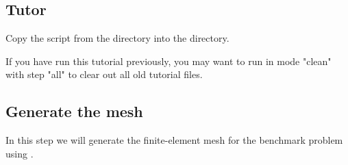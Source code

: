 \subsection{Tutor}

Copy the  script from the 
directory into the  directory. 

\begin{tip}
  If you have run this tutorial previously, you may want to run
   in mode "clean" with step "all" to clear out all
  old tutorial files.
\end{tip}

\begin{screen}
\shellprompt{}
\shellprompt{}
\shellprompt{}
\end{screen}

\subsection{Generate the mesh}

In this step we will generate the finite-element mesh for the
benchmark problem using .

